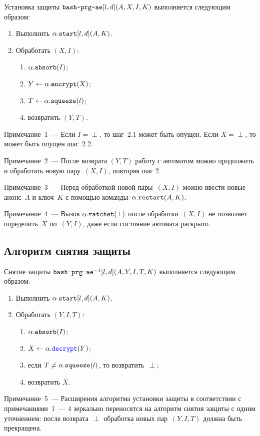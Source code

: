 Установка защиты $\texttt{bash-prg-ae}[l,d](A,X,I,K)$ выполняется следующим образом:
\begin{enumerate}
\item
Выполнить $\alpha.\texttt{start}[l,d](A,K)$.
\item
Обработать $(X,I)$:
\begin{enumerate}
\item
$\alpha.\texttt{absorb}(I)$;
\item
$Y\leftarrow\alpha.\texttt{encrypt}(X)$;
\item
$T\leftarrow \alpha.\texttt{squeeze}(l)$;
\item
возвратить $(Y,T)$.
\end{enumerate}
\end{enumerate}

\begin{note}
Примечание~1~--- 
Если $I=\perp$, то шаг~2.1 может быть опущен.
Если $X=\perp$, то может быть опущен шаг~2.2.
\end{note}

\begin{note}
Примечание~2~--- После возврата $(Y,T)$ работу с автоматом
можно продолжить и обработать новую пару~$(X,I)$, повторяя шаг 2.
\end{note}

\begin{note}
Примечание~3~--- Перед обработкой новой пары~$(X,I)$ можно ввести
новые анонс~$A$ и ключ~$K$ с помощью 
команды~$\alpha.\texttt{restart}(A, K)$.
\end{note}

\begin{note}
Примечание~4~--- Вызов $\alpha.\texttt{ratchet}(\perp)$
после обработки~$(X,I)$ не позволяет определить~$X$ по~$(Y,I)$,
даже если состояние автомата раскрыто. 
\end{note}

\subsection{Алгоритм снятия защиты}\label{PRG.AE.Unwrap}

Снятие защиты $\texttt{bash-prg-ae}^{-1}[l,d](A,Y,I,T,K)$ выполняется 
следующим образом:
\begin{enumerate}
\item
Выполнить $\alpha.\texttt{start}[l,d](A,K)$.
\item
Обработать $(Y,I,T)$:
\begin{enumerate}
\item
$\alpha.\texttt{absorb}(I)$;
\item
$X\leftarrow\alpha.\textcolor{blue}{\texttt{decrypt}}(Y)$;
\item
если $T\neq\alpha.\texttt{squeeze}(l)$, то возвратить~$\perp$;
\item
возвратить $X$.
\end{enumerate}
\end{enumerate}

\begin{note}
Примечание~5~--- Расширения алгоритма установки защиты в соответствии 
с примечаниями~1~--- 4 зеркально переносятся на алгоритм снятия защиты
с одним уточнением: после возврата~$\perp$ обработка новых пар~$(Y,I,T)$
должна быть прекращена.
\end{note}
